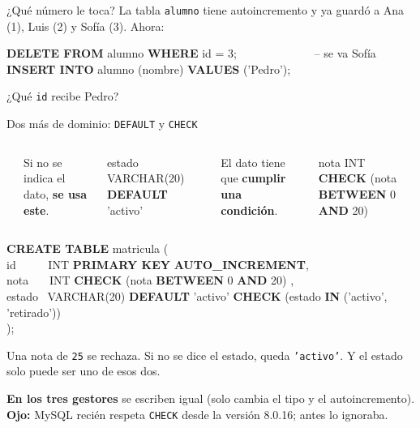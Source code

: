 \documentclass[aspectratio=169,10pt,c]{beamer}
\newcommand{\bl}[1][1.9cm]{\underline{\hspace{#1}}}
\newcommand{\tbl}[1]{\textcolor{utpNaranja}{\texttt{#1}}}
\newcommand{\kw}[1]{\textcolor{utpRojo}{\textbf{#1}}}
\newcommand{\nuevo}[1]{{%
  \setlength{\fboxsep}{1.2pt}%
  \begingroup
  \renewcommand{\kw}[1]{\textcolor{utpNegro}{\textbf{##1}}}%
  \colorbox{yellow!45}{\textcolor{utpNegro}{#1}}%
  \endgroup}}
\newcommand{\com}[1]{\textcolor{utpGris}{-- #1}}
\newcommand{\ins}[1]{\tikz[baseline=-0.5ex]{\node[rounded corners=2pt,fill=utpRojo,text=white,
  font=\bfseries\scriptsize,inner xsep=5pt,inner ysep=2.5pt] {#1};}}
\newcommand{\etiqueta}[1]{\tikz[baseline=-0.5ex]{\node[rounded corners=2pt,fill=utpNegro,text=white,
  font=\bfseries\scriptsize,inner xsep=6pt,inner ysep=3pt] {#1};}}
\newenvironment{sqlcode}[1][.86\textwidth]
  {\begin{center}\begin{lrbox}{\sqlbuf}\begin{minipage}{#1}\ttfamily\footnotesize\vspace{6pt}\raggedright}
  {\vspace{6pt}\end{minipage}\end{lrbox}\colorbox{utpGrisClaro}{\usebox{\sqlbuf}}\end{center}}
\newcommand{\ind}{\hspace*{1.6em}}
\begin{document}
\begin{frame}{\ins{Práctica 5} ¿Qué número le toca?}
\small La tabla \tbl{alumno} tiene autoincremento y ya guardó a Ana (1), Luis (2) y Sofía (3). Ahora:
\vspace{0.3cm}
\begin{sqlcode}[.72\textwidth]
\kw{DELETE FROM} alumno \kw{WHERE} id = 3; \ \ \ \ \ \ \ \ \ \ \ \ \ \com{se va Sofía}\\
\kw{INSERT INTO} alumno (nombre) \kw{VALUES} ('Pedro');
\end{sqlcode}
\vspace{0.3cm}
\begin{center}
\large ¿Qué \texttt{id} recibe Pedro? \ \ \bl[2cm]
\end{center}
\vspace{0.4cm}
\end{frame}

\begin{frame}{Dos más de dominio: \texttt{DEFAULT} y \texttt{CHECK}}
\begin{columns}[T,onlytextwidth]
\centering\etiqueta{DEFAULT}\\[4pt]
\raggedright\small Si no se indica el dato, \textbf{se usa este}.
\begin{sqlcode}[\textwidth]
\scriptsize
estado VARCHAR(20) \nuevo{\kw{DEFAULT} 'activo'}
\end{sqlcode}
\centering\etiqueta{CHECK}\\[4pt]
\raggedright\small El dato tiene que \textbf{cumplir una condición}.
\begin{sqlcode}[\textwidth]
\scriptsize
nota INT \nuevo{\kw{CHECK} (nota \kw{BETWEEN} 0 \kw{AND} 20)}
\end{sqlcode}
\end{columns}
\vspace{0.2cm}
\begin{sqlcode}[.90\textwidth]
\scriptsize
\kw{CREATE TABLE} matricula (\\
\ind id \ \ \ \ \ INT \kw{PRIMARY KEY} \kw{AUTO\_INCREMENT},\\
\ind nota \ \ \ INT \nuevo{\kw{CHECK} (nota \kw{BETWEEN} 0 \kw{AND} 20)},\\
\ind estado \ VARCHAR(20) \nuevo{\kw{DEFAULT} 'activo'} \nuevo{\kw{CHECK} (estado \kw{IN} ('activo', 'retirado'))}\\
);
\end{sqlcode}
\vspace{0.05cm}
\small Una nota de \texttt{25} se rechaza. Si no se dice el estado, queda \texttt{'activo'}. Y el estado solo puede ser uno de esos dos.
\vspace{0.2cm}

\small \textbf{En los tres gestores} se escriben igual (solo cambia el tipo y el autoincremento). \textbf{Ojo:} MySQL recién respeta \texttt{CHECK} desde la versión 8.0.16; antes lo ignoraba.
\end{frame}
\end{document}
